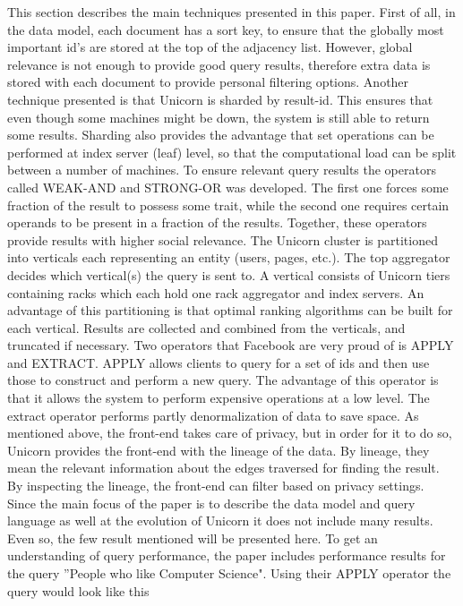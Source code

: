 \documentclass{article}
\begin{document}
\noindent This section describes the main techniques presented in this paper. First of all, in the data model, each document has a sort key, to ensure that the globally most important id's are stored at the top of the adjacency list. However, global relevance is not enough to provide good query results, therefore extra data is stored with each document to provide personal filtering options. 
Another technique presented is that Unicorn is sharded by result-id. This ensures that even though some machines might be down, the system is still able to return some results. Sharding also provides the advantage that set operations can be performed at index server (leaf) level, so that the computational load can be split between a number of machines. 
To ensure relevant query results the operators called WEAK-AND and STRONG-OR was developed. The first one forces some fraction of the result to possess some trait, while  the second one requires certain operands to be present in a fraction of the results. Together, these operators provide results with higher social relevance. 
The Unicorn cluster is partitioned into verticals each representing an entity (users, pages, etc.). The top aggregator decides which vertical(s) the query is sent to. A vertical consists of Unicorn tiers containing racks which each hold one rack aggregator and index servers. An advantage of this partitioning is that optimal ranking algorithms can be built for each vertical. Results are collected and combined from the verticals, and truncated if necessary. 
Two operators that Facebook are very proud of is APPLY and EXTRACT. APPLY allows clients to query for a set of ids and then use those to construct and perform a new query. The advantage of this operator is that it allows the system to perform expensive operations at a low level. The extract operator performs partly denormalization of data to save space. 
As mentioned above, the front-end takes care of privacy, but in order for it to do so, Unicorn provides the front-end with the lineage of the data. By lineage, they mean the relevant information about the edges traversed for finding the result. By inspecting the lineage, the front-end can filter based on privacy settings.\\


\noindent Since the main focus of the paper is to describe the data model and query language as well at the evolution of Unicorn it does not include many results. Even so, the few result mentioned will be presented here. To get an understanding of query performance, the paper includes performance results for the query ''People who like Computer Science". Using their APPLY operator the query would look like this\\
\end{document}
